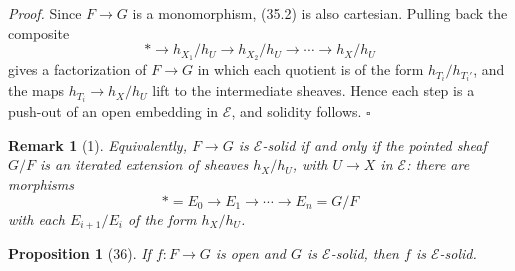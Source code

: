 \documentclass[11pt]{article}
\newcommand{\pt}{*}
\theoremstyle{deligne}
\newtheorem*{proposition*}{Proposition}
\newtheorem*{remark*}{Remark}
\newenvironment{proofdel}{\noindent\textit{Proof.}}{\hfill$\square$}
\begin{document}
\begin{proofdel}
Since \(F\to G\) is a monomorphism, (35.2) is also cartesian. Pulling back the composite
\[
\pt\longrightarrow h_{X_1}/h_U\longrightarrow h_{X_2}/h_U\longrightarrow\cdots\longrightarrow h_X/h_U
\]
gives a factorization of \(F\to G\) in which each quotient is of the form \(h_{T_i}/h_{T_i'}\), and the maps \(h_{T_i}\to h_X/h_U\) lift to the intermediate sheaves. Hence each step is a push-out of an open embedding in \(\mathcal E\), and solidity follows.
\end{proofdel}

\begin{remark*}[1]
Equivalently, \(F\to G\) is \(\mathcal E\)-solid if and only if the pointed sheaf \(G/F\) is an iterated extension of sheaves \(h_X/h_U\), with \(U\to X\) in \(\mathcal E\): there are morphisms
\[
\pt=E_0\to E_1\to\cdots\to E_n=G/F
\]
with each \(E_{i+1}/E_i\) of the form \(h_X/h_U\).
\end{remark*}

\begin{proposition*}[36]
If \(f:F\to G\) is open and \(G\) is \(\mathcal E\)-solid, then \(f\) is \(\mathcal E\)-solid.
\end{proposition*}
\end{document}
